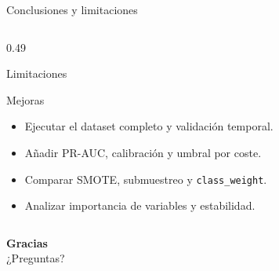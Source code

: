 \documentclass[aspectratio=169,11pt]{beamer}
\begin{document}
\begin{frame}{Conclusiones y limitaciones}
\begin{columns}[T]
\begin{column}{0.49\textwidth}
\begin{block}{Limitaciones}
      \end{block}
      \begin{block}{Mejoras}
        \scriptsize
        \begin{itemize}
          \item Ejecutar el dataset completo y validación temporal.
          \item Añadir PR-AUC, calibración y umbral por coste.
          \item Comparar SMOTE, submuestreo y \texttt{class\_weight}.
          \item Analizar importancia de variables y estabilidad.
        \end{itemize}
      \end{block}
    \end{column}
  \end{columns}
\end{frame}

\begin{frame}
  \centering
  \Huge \textbf{Gracias}\\[0.4cm]
  \Large ¿Preguntas?
\end{frame}

\appendix
\end{document}
